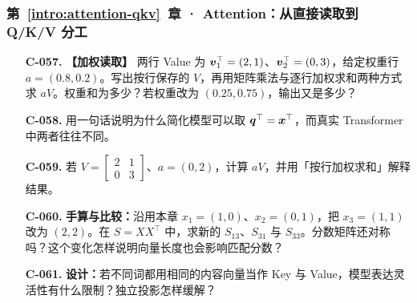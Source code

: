 \subsubsection*{第~\ref*{intro:attention-qkv}~章 · Attention：从直接读取到 Q/K/V 分工}
\begin{enumerate}[label={},leftmargin=4.8em,itemsep=4pt]
\item[\textbf{C-057.}] \leavevmode{}\label{exercise:C-057}\label{exercise:weighted-value-read}\textbf{【加权读取】} 两行 Value 为 $\boldsymbol{v}_1^\top=(2,1)$、$\boldsymbol{v}_2^\top=(0,3)$，给定权重行 $a=(0.8,0.2)$。写出按行保存的 $V$，再用矩阵乘法与逐行加权求和两种方式求 $aV$。权重和为多少？若权重改为 $(0.25,0.75)$，输出又是多少？
\item[\textbf{C-058.}] \leavevmode{}\label{exercise:C-058}\label{exercise:query-projection-choice}用一句话说明为什么简化模型可以取 $\boldsymbol{q}^\top=\boldsymbol{x}^\top$，而真实 Transformer 中两者往往不同。
\item[\textbf{C-059.}] \leavevmode{}\label{exercise:C-059}\label{exercise:unnormalized-value-read}若 $V=\begin{bmatrix}2&1\\0&3\end{bmatrix}$、$a=(0,2)$，计算 $aV$，并用「按行加权求和」解释结果。
\item[\textbf{C-060.}] \leavevmode{}\label{exercise:C-060}\label{exercise:self-dot-length}\textbf{手算与比较：}沿用本章 $x_1=(1,0)$、$x_2=(0,1)$，把 $x_3=(1,1)$ 改为 $(2,2)$。在 $S=XX^\top$ 中，求新的 $S_{13}$、$S_{31}$ 与 $S_{33}$。分数矩阵还对称吗？这个变化怎样说明向量长度也会影响匹配分数？
\item[\textbf{C-061.}] \leavevmode{}\label{exercise:C-061}\label{exercise:key-value-projections}\textbf{设计：}若不同词都用相同的内容向量当作 Key 与 Value，模型表达灵活性有什么限制？独立投影怎样缓解？
\end{enumerate}
